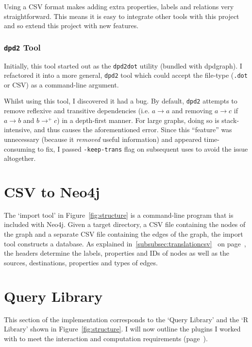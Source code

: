 Using a CSV format makes adding extra properties, labels and relations very
straightforward. This means it is easy to integrate other tools with this
project and so extend this project with new features.

\subsubsection{\texttt{dpd2} Tool}\label{subsubsec:dpd2}

Initially, this tool started out as the \texttt{dpd2dot} utility (bundled with
dpdgraph). I refactored it into a more general, \texttt{dpd2} tool which could
accept the file-type (\texttt{.dot} or CSV) as a command-line argument.

Whilst using this tool, I discovered it had a bug. By default, \texttt{dpd2}
attempts to remove reflexive and transitive dependencies (i.e. $a \rightarrow a$
and removing $a \rightarrow c$ if $a \rightarrow b$ and $b \rightarrow^{+} c$)
in a depth-first manner.  For large graphs, doing so is stack-intensive, and
thus causes the aforementioned error.  Since this ``feature'' was unnecessary
(because it \emph{removed} useful information) and appeared time-consuming to
fix, I passed \texttt{-keep-trans} flag on subsequent uses to avoid the issue
altogether.

\section{CSV to Neo4j}

The `import tool' in Figure~\ref{fig:structure} is a command-line program that
is included with Neo4j. Given a target directory, a CSV file containing the
nodes of the graph and a separate CSV file containing the edges of the graph,
the import tool constructs a database. As explained
in~\ref{subsubsec:translationcsv}~ on
page~\pageref{subsubsec:translationcsv}, the headers determine the labels,
properties and IDs of nodes as well as the sources, destinations, properties and
types of edges.

\section{Query Library}

This section of the implementation corresponds to the `Query Library' and the
`R Library' shown in Figure~\ref{fig:structure}. I will now outline the
plugins I worked with to meet the interaction and computation requirements
(page~\pageref{req:i1}).

